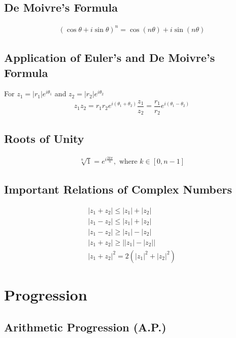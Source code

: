 \documentclass[openany, oneside]{book}
\begin{document}
\section{De Moivre's Formula}
\begin{align}
(\cos\theta+i\sin\theta)^n=\cos (n\theta)+i\sin(n\theta)
\end{align}

\section{Application of Euler's and De Moivre's Formula}
For $z_1=\lvert r_1 \rvert e^{i\theta_1}$ and $z_2=\lvert r_2 \rvert e^{i\theta_2}$
\begin{align}
z_1z_2=r_1r_2e^{i(\theta_1+\theta_2)}
\dfrac{z_1}{z_2}=\dfrac{r_1}{r_2}e^{i(\theta_1-\theta_2)}
\end{align}

\section{Roots of Unity}
\begin{align}
\sqrt[n]{1}=e^{i\frac{2k\pi}{n}},\text{ where } k \in [0,n-1]
\end{align}

\section{Important Relations of Complex Numbers}
\begin{align}
\lvert z_1+z_2\rvert \leq \lvert z_1 \rvert+\lvert z_2\rvert\\
\lvert z_1-z_2\rvert \leq \lvert z_1 \rvert+\lvert z_2\rvert\\
\lvert z_1-z_2\rvert \geq \lvert z_1 \rvert-\lvert z_2\rvert\\
\lvert z_1+z_2\rvert \geq \lvert \lvert z_1 \rvert-\lvert z_2\rvert\rvert\\
\lvert z_1+z_2 \rvert^2=2(\lvert z_1 \rvert^2+\lvert z_2 \rvert^2)
\end{align}

\large{\chapter{Progression}}
\section{Arithmetic Progression (A.P.)}
\end{document}
